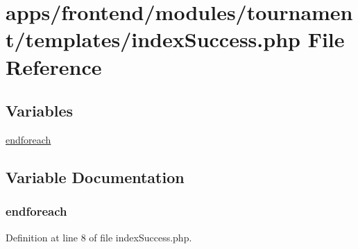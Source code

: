\hypertarget{frontend_2modules_2tournament_2templates_2index_success_8php}{\section{apps/frontend/modules/tournament/templates/index\-Success.php File Reference}
\label{frontend_2modules_2tournament_2templates_2index_success_8php}
}
\subsection*{Variables}
\begin{DoxyCompactItemize}
\item 
\hyperlink{frontend_2modules_2tournament_2templates_2index_success_8php_a672d9707ef91db026c210f98cc601123}{endforeach}
\end{DoxyCompactItemize}


\subsection{Variable Documentation}
\hypertarget{frontend_2modules_2tournament_2templates_2index_success_8php_a672d9707ef91db026c210f98cc601123}{
\subsubsection[{endforeach}]{\setlength{\rightskip}{0pt plus 5cm}endforeach}}\label{frontend_2modules_2tournament_2templates_2index_success_8php_a672d9707ef91db026c210f98cc601123}


Definition at line 8 of file index\-Success.\-php.

